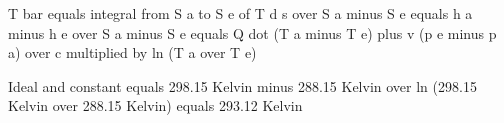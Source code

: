 T bar equals integral from S a to S e of T d s over S a minus S e  
equals h a minus h e over S a minus S e  
equals Q dot (T a minus T e) plus v (p e minus p a) over c multiplied by ln (T a over T e)  

Ideal and constant  
equals 298.15 Kelvin minus 288.15 Kelvin over ln (298.15 Kelvin over 288.15 Kelvin)  
equals 293.12 Kelvin